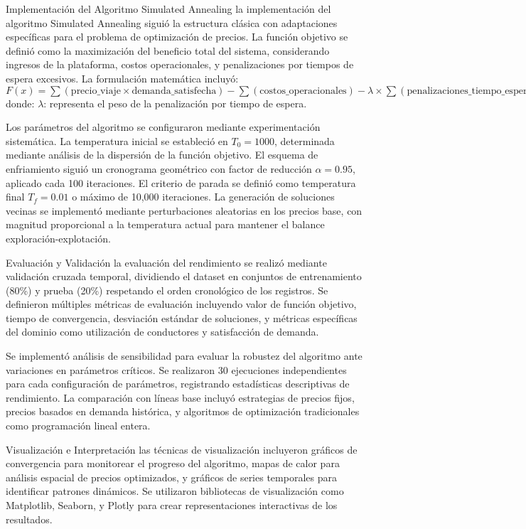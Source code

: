 \documentclass[12pt,a4paper,twocolumn]{article}
\begin{document}
Implementación del Algoritmo Simulated Annealing la implementación del algoritmo Simulated Annealing siguió la estructura clásica con adaptaciones específicas para el problema de optimización de precios. La función objetivo se definió como la maximización del beneficio total del sistema, considerando ingresos de la plataforma, costos operacionales, y penalizaciones por tiempos de espera excesivos. La formulación matemática incluyó: 
$F(x) = \sum(\text{precio\_viaje} \times \text{demanda\_satisfecha}) - \sum(\text{costos\_operacionales}) - \lambda \times \sum(\text{penalizaciones\_tiempo\_espera})$
donde:
$\lambda$: representa el peso de la penalización por tiempo de espera.

Los parámetros del algoritmo se configuraron mediante experimentación sistemática. La temperatura inicial se estableció en $T_0 = 1000$, determinada mediante análisis de la dispersión de la función objetivo. El esquema de enfriamiento siguió un cronograma geométrico con factor de reducción $\alpha = 0.95$, aplicado cada 100 iteraciones. El criterio de parada se definió como temperatura final $T_f = 0.01$ o máximo de 10,000 iteraciones. La generación de soluciones vecinas se implementó mediante perturbaciones aleatorias en los precios base, con magnitud proporcional a la temperatura actual para mantener el balance exploración-explotación.

Evaluación y Validación la evaluación del rendimiento se realizó mediante validación cruzada temporal, dividiendo el dataset en conjuntos de entrenamiento (80\%) y prueba (20\%) respetando el orden cronológico de los registros. Se definieron múltiples métricas de evaluación incluyendo valor de función objetivo, tiempo de convergencia, desviación estándar de soluciones, y métricas específicas del dominio como utilización de conductores y satisfacción de demanda.

Se implementó análisis de sensibilidad para evaluar la robustez del algoritmo ante variaciones en parámetros críticos. Se realizaron 30 ejecuciones independientes para cada configuración de parámetros, registrando estadísticas descriptivas de rendimiento. La comparación con líneas base incluyó estrategias de precios fijos, precios basados en demanda histórica, y algoritmos de optimización tradicionales como programación lineal entera.

Visualización e Interpretación las técnicas de visualización incluyeron gráficos de convergencia para monitorear el progreso del algoritmo, mapas de calor para análisis espacial de precios optimizados, y gráficos de series temporales para identificar patrones dinámicos. Se utilizaron bibliotecas de visualización como Matplotlib, Seaborn, y Plotly para crear representaciones interactivas de los resultados.
\end{document}
